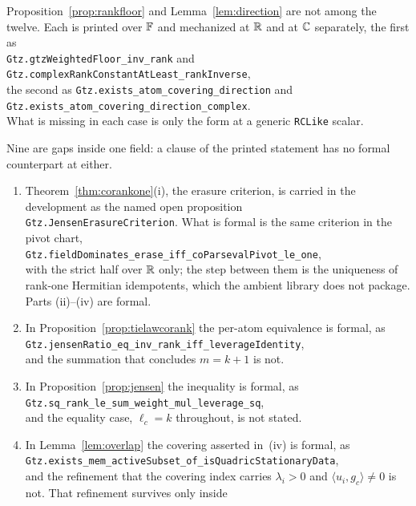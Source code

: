 Proposition~\ref{prop:rankfloor} and Lemma~\ref{lem:direction} are not among
the twelve.  Each is printed over $\mathbb{F}$ and mechanized at $\mathbb{R}$ and at $\mathbb{C}$
separately, the first as\\
\texttt{Gtz.gtzWeightedFloor\_inv\_rank} and\\
\texttt{Gtz.complexRankConstantAtLeast\_rankInverse},\\
the second as \texttt{Gtz.exists\_atom\_covering\_direction} and\\
\texttt{Gtz.exists\_atom\_covering\_direction\_complex}.\\
What is missing in each case is only the form at a generic \texttt{RCLike}
scalar.

Nine are gaps inside one field: a clause of the printed statement has no
formal counterpart at either.
\begin{enumerate}
\item[\rm(i)] Theorem~\ref{thm:corankone}(i), the erasure criterion, is
  carried in the development as the named open proposition\\
  \texttt{Gtz.JensenErasureCriterion}.  What is formal is the same criterion
  in the pivot chart,\\
  \texttt{Gtz.fieldDominates\_erase\_iff\_coParsevalPivot\_le\_one},\\
  with the strict half over $\mathbb{R}$ only; the step between them is the
  uniqueness of rank-one Hermitian idempotents, which the ambient library
  does not package.  Parts (ii)--(iv) are formal.
\item[\rm(ii)] In Proposition~\ref{prop:tielawcorank} the per-atom
  equivalence is formal, as\\
  \texttt{Gtz.jensenRatio\_eq\_inv\_rank\_iff\_leverageIdentity},\\
  and the summation that concludes $m=k+1$ is not.
\item[\rm(iii)] In Proposition~\ref{prop:jensen} the inequality is formal, as\\
  \texttt{Gtz.sq\_rank\_le\_sum\_weight\_mul\_leverage\_sq},\\
  and the equality case, $\ell_c=k$ throughout, is not stated.
\item[\rm(iv)] In Lemma~\ref{lem:overlap} the covering asserted in~(iv) is
  formal, as\\
  \texttt{Gtz.exists\_mem\_activeSubset\_of\_isQuadricStationaryData},\\
  and the refinement that the covering index carries $\lambda_i>0$ and
  $\langle u_i,g_c\rangle\ne0$ is not.  That refinement survives only inside

\end{enumerate}
